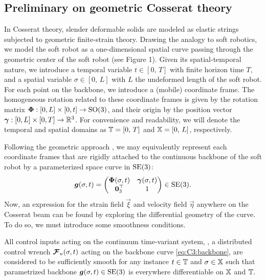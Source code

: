 \subsection{Preliminary on geometric Cosserat theory}
In Cosserat theory, slender deformable solids are modeled as elastic strings subjected to geometric finite-strain theory. Drawing the analogy to soft robotics, we model the soft robot as a one-dimensional spatial curve passing through the geometric center of the soft robot (see Figure 1). Given its spatial-temporal nature, we introduce a temporal variable $t \in [0,\,T]$ with finite horizon time $T$, and a spatial variable $\sigma \in [0,\,L]$ with $L$ the undeformed length of the soft robot. For each point on the backbone, we introduce a (mobile) coordinate frame. The homogeneous rotation related to these coordinate frames is given by the rotation matrix $\boldsymbol{\Phi}: [0,L] \times [0,t] \to  \textup{\textrm{SO}}(3)$, and their origin by the position vector $\boldsymbol{\gamma}: [0,L] \times [0,T] \to \mathbb{R}^3$. For convenience and readability, we will denote the temporal and spatial domains as $\mathbb{T} = [0,\,T]$ and $\mathbb{X} = [0,\,L]$, respectively.

Following the geometric approach \cite{Simo1986,Boyer2010,Boyer2021,Renda2018,Renda2020}, we may equivalently represent each coordinate frames that are rigidly attached to the continuous backbone of the soft robot by a parameterized space curve in $\textup{\textrm{SE}}(3)$:
%
\begin{equation}
\boldsymbol{g}(\sigma,t) = \begin{pmatrix} \boldsymbol{\Phi}(\sigma,t) & \boldsymbol{\gamma}(\sigma,t) \\ \boldsymbol{0}_3^\top & 1 \end{pmatrix} \in \textup{\textrm{SE}}(3).
\label{eq:C3:backbone}
\end{equation}
%
Now, an expression for the strain field $\vec{\xi}$ and velocity field $\vec{\eta}$ anywhere on the Cosserat beam can be found by exploring the differential geometry of the curve. To do so, we must introduce some smoothness conditions.

\begin{asm}[On differentiability]
\label{assum:1}
All control inputs acting on the continuum time-variant system, \ie, a distributed control wrench ${\boldsymbol{\mathcal{F}}}_{u}(\sigma,t)$ acting on the backbone curve \eqref{eq:C3:backbone}, are considered to be sufficiently smooth for any instance $t \in \mathbb{T}$ and $\sigma \in \mathbb{X}$ such that parametrized backbone $\boldsymbol{g}(\sigma,t) \in \textup{\textrm{SE}}(3)$ is everywhere differentiable on $\mathbb{X}$ and $\mathbb{T}$.
\end{asm}

